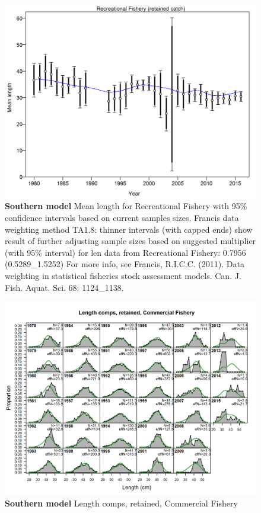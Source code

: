 \documentclass[12pt,]{article}
\begin{document}
\begin{figure}[htbp]
\centering
\includegraphics{./tex2pdf.8516/7a5deaf727f3bc51a2241fe6cc976b8fd1579fd7.png}
\caption{\textbf{Southern model} Mean length for Recreational Fishery
with 95\% confidence intervals based on current samples sizes. Francis
data weighting method TA1.8: thinner intervals (with capped ends) show
result of further adjusting sample sizes based on suggested multiplier
(with 95\% interval) for len data from Recreational Fishery: 0.7956
(0.5289\_1.5252) For more info, see Francis, R.I.C.C. (2011). Data
weighting in statistical fisheries stock assessment models. Can. J.
Fish. Aquat. Sci. 68: 1124\_1138.
\label{fig:mod2_4_comp_lenfit_data_weighting_TA1.8_Recreational Fishery}}
\end{figure}

\begin{figure}[htbp]
\centering
\includegraphics{./r4ss/plots_mod2/comp_lenfit_flt2mkt2.png}
\caption{\textbf{Southern model} Length comps, retained, Commercial
Fishery \label{fig:mod2_5_comp_lenfit_flt2mkt2}}
\end{figure}
\end{document}
